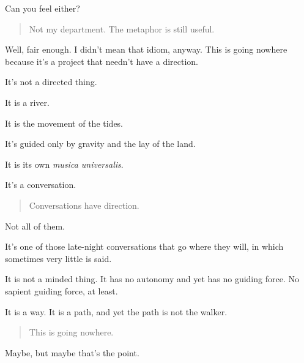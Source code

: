 Can you feel either?

\begin{quote}
Not my department. The metaphor is still useful.
\end{quote}

Well, fair enough. I didn't mean that idiom, anyway. This is going nowhere because it's a project that needn't have a direction.

It's not a directed thing.

It is a river.

It is the movement of the tides.

It's guided only by gravity and the lay of the land.

It is its own \emph{musica universalis}.

It's a conversation.

\begin{quote}
Conversations have direction.
\end{quote}

Not all of them.

It's one of those late-night conversations that go where they will, in which sometimes very little is said.

It is not a minded thing. It has no autonomy and yet has no guiding force. No sapient guiding force, at least.

It is a way. It is a path, and yet the path is not the walker.

\begin{quote}
This is going nowhere.
\end{quote}

Maybe, but maybe that's the point.
